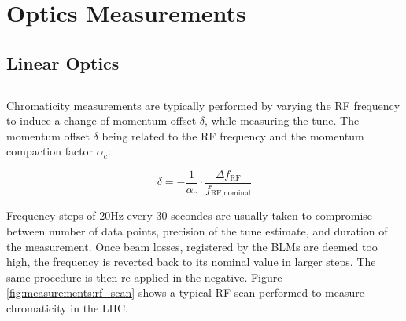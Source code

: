 \section{Optics Measurements}



\subsection{Linear Optics}




\subsection{}
\label{subsection:optics_corrections_chromaticity}

\subsubsection{}

Chromaticity measurements are typically performed by varying the RF frequency to induce a change of
momentum offset $\delta$, while measuring the tune.  The momentum offset $\delta$ being related to
the RF frequency and the momentum compaction factor $\alpha_c$:

\begin{equation}
    \delta = - \frac{1}{\alpha_c} \cdot \frac{\Delta f_{\text{RF}}}{f_{\text{RF,nominal}}}
    \label{eq:dpp_rf}
\end{equation}

Frequency steps of 20Hz every 30 secondes are usually taken to compromise between number of data
points, precision of the tune estimate, and duration of the measurement. Once beam losses,
registered by the BLMs are deemed too high, the frequency is reverted back to its nominal value in
larger steps. The same procedure is then re-applied in the negative. Figure
\ref{fig:measurements:rf_scan} shows a typical RF scan performed to measure chromaticity in the LHC.

